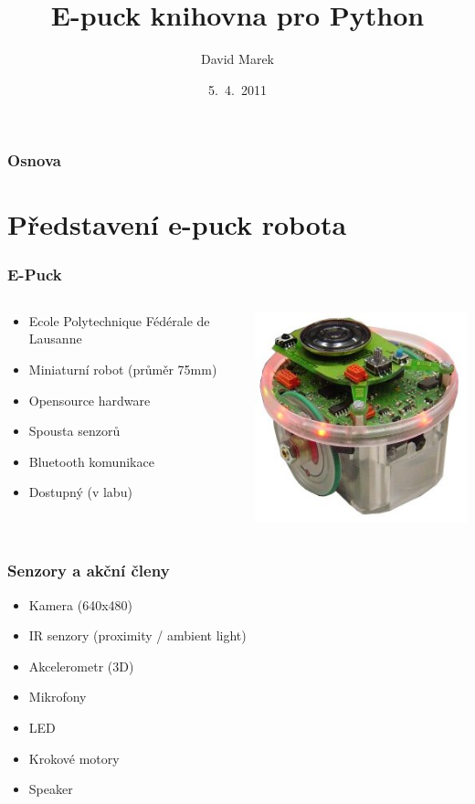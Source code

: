 \documentclass{beamer}
\title{E-puck knihovna pro Python}
\author{David Marek}
\institute[MFF UK]{Univerzita Karlova v Praze}
\date{5.~4.~2011}
\begin{document}
\begin{frame}
    \titlepage
\end{frame}

\begin{frame}
    \frametitle{Osnova}
    \tableofcontents
\end{frame}

\section{Představení e-puck robota}

\begin{frame}
    \frametitle{E-Puck}
    \begin{columns}
        \begin{column}{.6\textwidth}
            \begin{itemize}
                \item Ecole Polytechnique Fédérale de Lausanne
                \item Miniaturní robot (průměr 75mm)
                \item Opensource hardware
                \item Spousta senzorů
                \item Bluetooth komunikace
                \item Dostupný (v labu)
            \end{itemize}
        \end{column}

        \begin{column}{.4\textwidth}
            \includegraphics[scale=0.4]{e-puck.jpg}
        \end{column}
    \end{columns}
\end{frame}


\begin{frame}
    \frametitle{Senzory a akční členy}
    \begin{itemize}
        \item Kamera (640x480)
        \item IR senzory (proximity / ambient light)
        \item Akcelerometr (3D)
        \item Mikrofony
        \item LED
        \item Krokové motory
        \item Speaker
    \end{itemize}
\end{frame}
\end{document}

